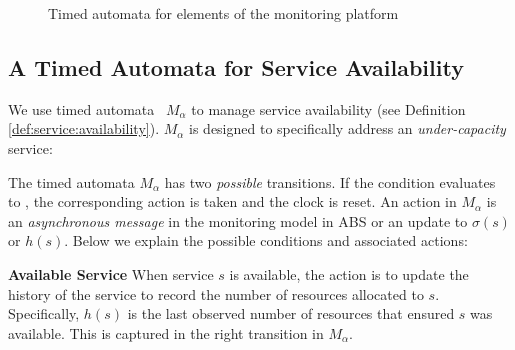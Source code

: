 \begin{figure}[t]
{
}


\caption{Timed automata for elements of the monitoring platform}
\label{fig:fsm}
\end{figure}

\subsection{A Timed Automata for Service Availability}
\label{sec:service:avail:fsm}

We use timed automata~\cite{alur:1994:timedautomata} $M_\alpha$ to manage service availability (see Definition \ref{def:service:availability}).
$M_\alpha$ is designed to specifically address an \emph{under-capacity} service:

The timed automata $M_\alpha$ has two \emph{possible} transitions.
If the condition evaluates to , the corresponding action is taken and the clock is reset.
An action in $M_\alpha$ is an \emph{asynchronous message} in the monitoring model in ABS or an update to $\sigma(s)$ or $h(s)$.
Below we explain the possible conditions and associated actions:

\textbf{Available Service}
  When service $s$ is available, the action is to update the history of the service to record the number of resources allocated to $s$. 
  Specifically, $h(s)$ is the last observed number of resources that ensured $s$ was available.
  This is captured in the right transition in $M_\alpha$.

